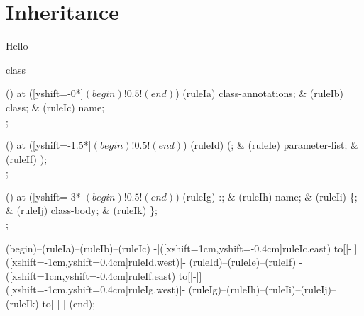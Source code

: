 \chapter{Inheritance}

Hello

\begin{syntaxfloat}
  \begin{syntax}{class}
    
    \node[sequence] () at ([yshift=-0*\syntaxruledist]$(begin)!0.5!(end)$) {
      \node[nonterminal] (ruleIa) {class-annotations};
      &
      \node[terminal]    (ruleIb) {class};
      &
      \node[nonterminal] (ruleIc) {name};
      \\
    };
    
    \node[sequence] () at ([yshift=-1.5*\syntaxruledist]$(begin)!0.5!(end)$) {
      \node[terminal]    (ruleId) {(};
      &
      \node[nonterminal] (ruleIe) {parameter-list};
      &
      \node[terminal]    (ruleIf) {)};
      \\
    };
    
    \node[sequence] () at ([yshift=-3*\syntaxruledist]$(begin)!0.5!(end)$) {
      \node[nonterminal] (ruleIg) {:};
      &
      \node[nonterminal] (ruleIh) {name};
      &
      \node[terminal] (ruleIi) {\{};
      &
      \node[nonterminal] (ruleIj) {class-body};
      &
      \node[terminal] (ruleIk) {\}};
      \\
    };
    
    \draw[path] (begin)--(ruleIa)--(ruleIb)--(ruleIc)
      -|([xshift=1cm,yshift=-0.4cm]ruleIc.east) to[|-|] ([xshift=-1cm,yshift=0.4cm]ruleId.west)|-
      (ruleId)--(ruleIe)--(ruleIf)
      -|([xshift=1cm,yshift=-0.4cm]ruleIf.east) to[|-|] ([xshift=-1cm,yshift=0.4cm]ruleIg.west)|-
      (ruleIg)--(ruleIh)--(ruleIi)--(ruleIj)--(ruleIk) to[-|-] (end);
  \end{syntax}
  \caption{Class definition with inherence}
\end{syntaxfloat}
